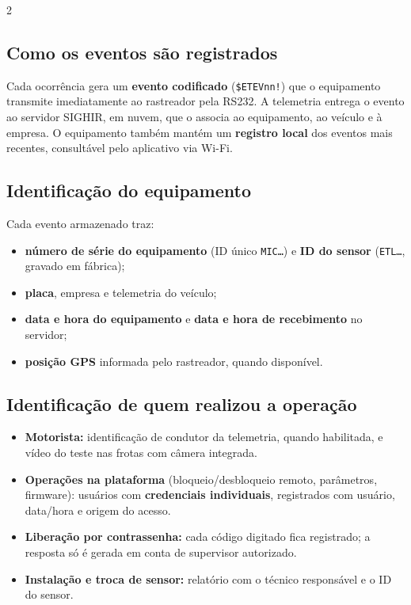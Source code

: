 \documentclass[a4paper,10pt]{article}
\newcommand{\ev}[1]{\texttt{\$ETEV#1!}}
\begin{document}
\begin{multicols}{2}
\subsection{Como os eventos são registrados}
Cada ocorrência gera um \textbf{evento codificado} (\ev{nn}) que o equipamento transmite
imediatamente ao rastreador pela RS232. A telemetria entrega o evento ao servidor SIGHIR, em
nuvem, que o associa ao equipamento, ao veículo e à empresa. O equipamento também mantém um
\textbf{registro local} dos eventos mais recentes, consultável pelo aplicativo via Wi-Fi.

\subsection{Identificação do equipamento}
Cada evento armazenado traz:
\begin{itemize}
  \item \textbf{número de série do equipamento} (ID único \texttt{MIC…}) e \textbf{ID do sensor} (\texttt{ETL…}, gravado em fábrica);
  \item \textbf{placa}, empresa e telemetria do veículo;
  \item \textbf{data e hora do equipamento} e \textbf{data e hora de recebimento} no servidor;
  \item \textbf{posição GPS} informada pelo rastreador, quando disponível.
\end{itemize}

\subsection{Identificação de quem realizou a operação}
\begin{itemize}
  \item \textbf{Motorista:} identificação de condutor da telemetria, quando habilitada, e vídeo do teste nas frotas com câmera integrada.
  \item \textbf{Operações na plataforma} (bloqueio/desbloqueio remoto, parâmetros, firmware): usuários com \textbf{credenciais individuais}, registrados com usuário, data/hora e origem do acesso.
  \item \textbf{Liberação por contrassenha:} cada código digitado fica registrado; a resposta só é gerada em conta de supervisor autorizado.
  \item \textbf{Instalação e troca de sensor:} relatório com o técnico responsável e o ID do sensor.
\end{itemize}


\end{multicols}
\end{document}
